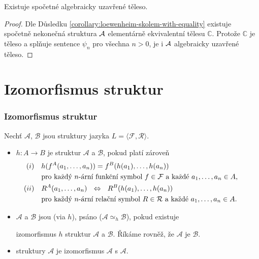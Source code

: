\begin{corollary}
    Existuje spočetné algebraicky uzavřené těleso.
\end{corollary}
\begin{proof}
    Dle Důsledku \ref{corollary:loewenheim-skolem-with-equality} existuje spočetně nekonečná struktura $\mathcal{A}$ elementárně ekvivalentní tělesu $\mathbb C$. Protože $\mathbb C$ je těleso a splňuje sentence $\psi_n$ pro všechna $n>0$, je i $\mathcal{A}$ algebraicky uzavřené těleso.
\end{proof}


\section{Izomorfismus struktur}\label{section:isomorphism-of-structures}\todo

\subsubsection*{Izomorfismus struktur}
    
    Nechť $\mathcal{A}$, $\mathcal{B}$ jsou struktury jazyka $L=\langle\mathcal{F},\mathcal{R}\rangle$.
    \smallskip
    
    \begin{itemize}
    \item {} $h\colon A\to B$ je  struktur $\mathcal{A}$ a $\mathcal{B}$, pokud platí zároveň
    \vspace{-2mm}
    \begin{align*}\myblue{(i)}\quad&\mygreen{h(f^A(a_1,\dots,a_n))=f^B(h(a_1),\dots,h(a_n))}\\
    &\text{pro každý $n$-ární funkční symbol $f\in \mathcal{F}$ a každé $a_1,\dots,a_n\in A$,\qquad}\\
    \myblue{(ii)}\quad&\mygreen{R^A(a_1,\dots,a_n)\ \ \Leftrightarrow\ \ R^B(h(a_1),\dots,h(a_n))}\\
    &\text{pro každý $n$-ární relační symbol $R\in \mathcal{R}$ a každé $a_1,\dots,a_n\in A$.}
    \end{align*}
    
    \vspace{-1mm}
    \item $\mathcal{A}$ a $\mathcal{B}$ jsou  (via $h$), psáno  ($\mathcal{A}\simeq_h\mathcal{B}$), pokud existuje
        \smallskip
    
        izomorfismus $h$ struktur $\mathcal{A}$ a $\mathcal{B}$. Říkáme rovněž, že $\mathcal{A}$ je  $\mathcal{B}$.
    \smallskip
    
    \item {} struktury $\mathcal{A}$ je izomorfismus $\mathcal{A}$ s $\mathcal{A}$.
    \end{itemize}
    \medskip
    
